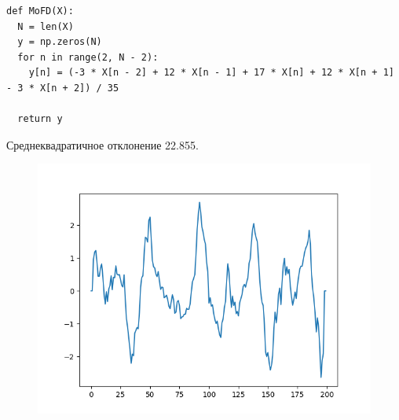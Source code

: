\documentclass[12pt]{article}
\begin{document}
\begin{lstlisting}
def MoFD(X):
  N = len(X)
  y = np.zeros(N)
  for n in range(2, N - 2):
    y[n] = (-3 * X[n - 2] + 12 * X[n - 1] + 17 * X[n] + 12 * X[n + 1] - 3 * X[n + 2]) / 35

  return y
\end{lstlisting}

Среднеквадратичное отклонение 22.855.

\begin{figure}[!htb]
\centering
\includegraphics[scale=1.00]{fourth_diff.png}
\caption{}
\label{}


\end{figure}
\end{document}
